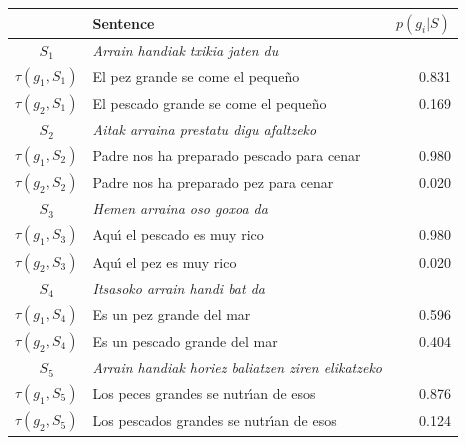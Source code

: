 \documentclass[25pt, a0paper, portrait, margin=0mm, innermargin=15mm,blockverticalspace=15mm, colspace=15mm, subcolspace=8mm]{tikzposter}
\begin{document}
\begin{columns}
{
\begin{center}
\begin{tabular}{|c|l|r|}
     \hline
        & \textbf{Sentence} & $p(g_i|S)$ \\
     \hline %
      \(S_1\) & \emph{Arrain handiak txikia jaten du}  &  \\
                         $\tau(g_{1},S_1)$ & El pez grande se come el peque\~{n}o &  0.831 \\
                         $\tau(g_{2},S_1)$ & El pescado grande se come el peque\~{n}o & 0.169 \\
     \hline %
      \(S_2\) & \emph{Aitak arraina prestatu digu afaltzeko} &  \\
                         $\tau(g_{1},S_2)$ & Padre nos ha preparado pescado para cenar & 0.980 \\
                         $\tau(g_{2},S_2)$ & Padre nos ha preparado pez para cenar & 0.020 \\
     \hline %
     $S_3$  & \emph{Hemen arraina oso goxoa da}  & \\
                         $\tau(g_{1},S_3)$ & Aqu\'{\i} el pescado es muy rico & 0.980 \\
                         $\tau(g_{2},S_3)$ & Aqu\'{\i} el pez es muy rico & 0.020 \\
     \hline %
     \(S_4\) & \emph{Itsasoko arrain handi bat da} & \\
                         $\tau(g_{1},S_4)$ & Es un pez grande del mar & 0.596 \\
                         $\tau(g_{2},S_4)$ & Es un pescado grande del mar & 0.404 \\
     \hline %
     $S_5$ &  \emph{Arrain handiak horiez baliatzen ziren elikatzeko} &  \\
                         $\tau(g_{1},S_5)$ & Los peces grandes se nutr\'{\i}an de esos & 0.876 \\
                         $\tau(g_{2},S_5)$ & Los pescados grandes se nutr\'{\i}an de esos & 0.124 \\
     \hline
   
   \end{tabular}
\end{center}
}

\end{columns}
\end{document}
